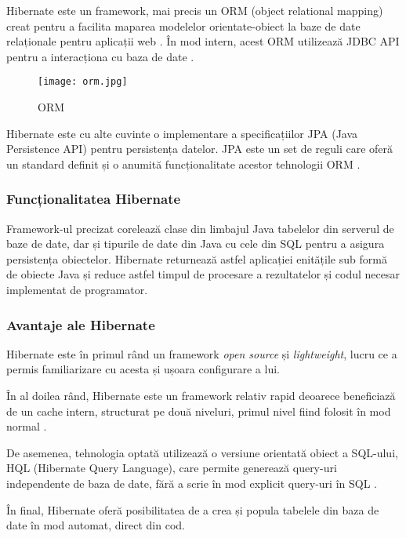 Hibernate este un framework, mai precis un ORM (object relational mapping) creat pentru a facilita maparea modelelor orientate-obiect la baze de date relaționale pentru aplicații web \cite{hibernate1}. În mod intern, acest ORM utilizează JDBC API pentru a interacționa cu baza de date \cite{hibernate2}.

\begin{figure}[H]
	\centering
	\texttt{[image: orm.jpg]}
	\caption{ORM}
\end{figure}

Hibernate este cu alte cuvinte o implementare a specificațiilor JPA (Java Persistence API) pentru persistența datelor. JPA este un set de reguli care oferă un standard definit și o anumită funcționalitate acestor tehnologii ORM \cite{hibernate2}.

\subsubsection{Funcționalitatea Hibernate}

Framework-ul precizat corelează clase din limbajul Java tabelelor din serverul de baze de date, dar și tipurile de date din Java cu cele din SQL pentru a asigura persistența obiectelor. Hibernate returnează astfel aplicației enitățile sub formă de obiecte Java și reduce astfel timpul de procesare a rezultatelor și codul necesar implementat de programator.

\subsubsection{Avantaje ale Hibernate}

Hibernate este în primul rând un framework \textit{open source} și \textit{lightweight}, lucru ce a permis familiarizare cu acesta și ușoara configurare a lui.

În al doilea rând, Hibernate este un framework relativ rapid deoarece beneficiază de un cache intern, structurat pe două niveluri, primul nivel fiind folosit în mod normal \cite{hibernate2}.

De asemenea, tehnologia optată utilizează o versiune orientată obiect a SQL-ului, HQL (Hibernate Query Language), care permite generează query-uri independente de baza de date, fără a scrie în mod explicit query-uri în SQL \cite{hibernate2}.

În final, Hibernate oferă posibilitatea de a crea și popula tabelele din baza de date în mod automat, direct din cod.

